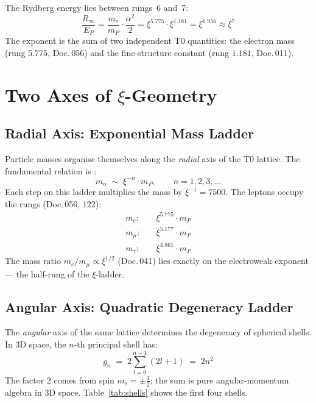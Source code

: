 The Rydberg energy lies between rungs~6 and~7:
\begin{equation}
  \frac{R_\infty}{E_P}
  = \frac{m_e}{m_P} \cdot \frac{\alpha^2}{2}
  = \xi^{5.775} \cdot \xi^{1.181}
  = \xi^{6.956}
  \approx \xi^7
\end{equation}
The exponent is the sum of two independent T0 quantities: the electron mass
(rung $5.775$, Doc.\,056) and the fine-structure constant (rung $1.181$,
Doc.\,011).

\section{Two Axes of \texorpdfstring{$\xi$}{xi}-Geometry}
\label{sec:two-axes}

\subsection{Radial Axis: Exponential Mass Ladder}
\label{subsec:radial}

Particle masses organise themselves along the \emph{radial} axis of the T0
lattice. The fundamental relation is \cite{dok009}:
\begin{equation}
  m_n \;\sim\; \xi^{-n} \cdot m_P, \qquad n = 1, 2, 3, \ldots
\end{equation}
Each step on this ladder multiplies the mass by $\xi^{-1} = 7500$.
The leptons occupy the rungs (Doc.\,056, 122):
\begin{align}
  m_e:    &\quad \xi^{5.775} \cdot m_P \\
  m_\mu:  &\quad \xi^{5.177} \cdot m_P \\
  m_\tau: &\quad \xi^{4.861} \cdot m_P
\end{align}
The mass ratio $m_e/m_\mu \propto \xi^{1/2}$ (Doc.\,041) lies exactly on the
electroweak exponent — the half-rung of the $\xi$-ladder.

\subsection{Angular Axis: Quadratic Degeneracy Ladder}
\label{subsec:angular}

The \emph{angular} axis of the same lattice determines the degeneracy of
spherical shells. In 3D space, the $n$-th principal shell has:
\begin{equation}
  g_n \;=\; 2 \sum_{l=0}^{n-1} (2l+1) \;=\; 2n^2
  \label{eq:gn}
\end{equation}
The factor 2 comes from spin $m_s = \pm\tfrac{1}{2}$; the sum is pure
angular-momentum algebra in 3D space. Table~\ref{tab:shells} shows the
first four shells.

